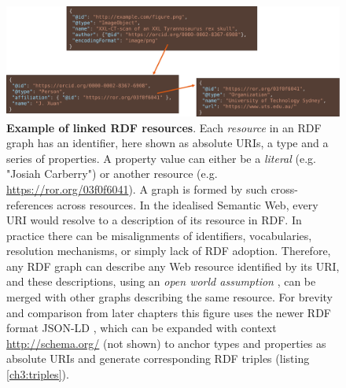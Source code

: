 \begin{figure}[hbt!]
  \includegraphics[width=\textwidth]{figures/ch03/jsonld.pdf}
    \caption[Example of linked RDF resources]{\textbf{Example of linked RDF resources}. Each \emph{resource} in an RDF graph has an identifier, here shown as absolute URIs, a type and a series of properties. A property value can either be a \emph{literal} (e.g. "Josiah Carberry") or another resource (e.g. \url{https://ror.org/03f0f6041}). A graph is formed by such cross-references across resources.
    In the idealised Semantic Web, every URI would resolve to a description of its resource in RDF. In practice there can be misalignments of identifiers, vocabularies, resolution mechanisms, or simply lack of RDF adoption. Therefore, any RDF graph can describe any Web resource identified by its URI, and these descriptions, using an \emph{open world assumption} \cite{Drummond 2006}, can be merged with other graphs describing the same resource.
    For brevity and comparison from later chapters this figure uses the newer RDF format JSON-LD \cite{Sporny 2020}, 
    which can be expanded with context \url{http://schema.org/} (not shown) to anchor types and 
    properties as absolute URIs and generate corresponding RDF triples (listing \vref{ch3:triples}). 
    }
  \label{ch3:fig:jsonld}
\end{figure}

